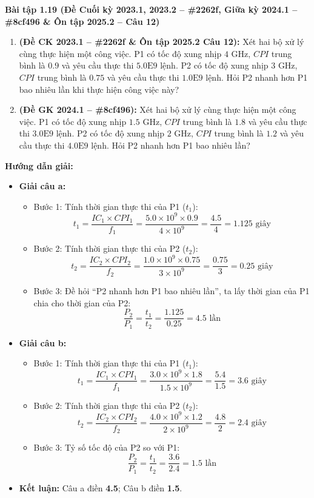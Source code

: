 \textbf{Bài tập 1.19 (Đề Cuối kỳ 2023.1, 2023.2 -- \#2262f, Giữa kỳ 2024.1 -- \#8cf496 \& Ôn tập 2025.2 -- Câu 12)}
\begin{enumerate}[label=\alph*)]
    \item \textbf{(Đề CK 2023.1 -- \#2262f \& Ôn tập 2025.2 Câu 12):} Xét hai bộ xử lý cùng thực hiện một công việc. P1 có tốc độ xung nhịp $4\text{ GHz}$, $CPI$ trung bình là $0.9$ và yêu cầu thực thi $5.0\text{E}9$ lệnh. P2 có tốc độ xung nhịp $3\text{ GHz}$, $CPI$ trung bình là $0.75$ và yêu cầu thực thi $1.0\text{E}9$ lệnh. Hỏi P2 nhanh hơn P1 bao nhiêu lần khi thực hiện công việc này?
    \item \textbf{(Đề GK 2024.1 -- \#8cf496):} Xét hai bộ xử lý cùng thực hiện một công việc. P1 có tốc độ xung nhịp $1.5\text{ GHz}$, $CPI$ trung bình là $1.8$ và yêu cầu thực thi $3.0\text{E}9$ lệnh. P2 có tốc độ xung nhịp $2\text{ GHz}$, $CPI$ trung bình là $1.2$ và yêu cầu thực thi $4.0\text{E}9$ lệnh. Hỏi P2 nhanh hơn P1 bao nhiêu lần?
\end{enumerate}
\textbf{Hướng dẫn giải:}
\begin{itemize}
    \item \textbf{Giải câu a:}
    \begin{itemize}
        \item Bước 1: Tính thời gian thực thi của P1 ($t_1$):
        $$t_1 = \frac{IC_1 \times CPI_1}{f_1} = \frac{5.0 \times 10^9 \times 0.9}{4 \times 10^9} = \frac{4.5}{4} = 1.125\text{ giây}$$
        \item Bước 2: Tính thời gian thực thi của P2 ($t_2$):
        $$t_2 = \frac{IC_2 \times CPI_2}{f_2} = \frac{1.0 \times 10^9 \times 0.75}{3 \times 10^9} = \frac{0.75}{3} = 0.25\text{ giây}$$
        \item Bước 3: Đề hỏi ``P2 nhanh hơn P1 bao nhiêu lần'', ta lấy thời gian của P1 chia cho thời gian của P2:
        $$\frac{P_2}{P_1} = \frac{t_1}{t_2} = \frac{1.125}{0.25} = 4.5\text{ lần}$$
    \end{itemize}
    \item \textbf{Giải câu b:}
    \begin{itemize}
        \item Bước 1: Tính thời gian thực thi của P1 ($t_1$):
        $$t_1 = \frac{IC_1 \times CPI_1}{f_1} = \frac{3.0 \times 10^9 \times 1.8}{1.5 \times 10^9} = \frac{5.4}{1.5} = 3.6\text{ giây}$$
        \item Bước 2: Tính thời gian thực thi của P2 ($t_2$):
        $$t_2 = \frac{IC_2 \times CPI_2}{f_2} = \frac{4.0 \times 10^9 \times 1.2}{2 \times 10^9} = \frac{4.8}{2} = 2.4\text{ giây}$$
        \item Bước 3: Tỷ số tốc độ của P2 so với P1:
        $$\frac{P_2}{P_1} = \frac{t_1}{t_2} = \frac{3.6}{2.4} = 1.5\text{ lần}$$
    \end{itemize}
    \item \textbf{Kết luận:} Câu a điền \textbf{4.5}; Câu b điền \textbf{1.5}.
\end{itemize}

